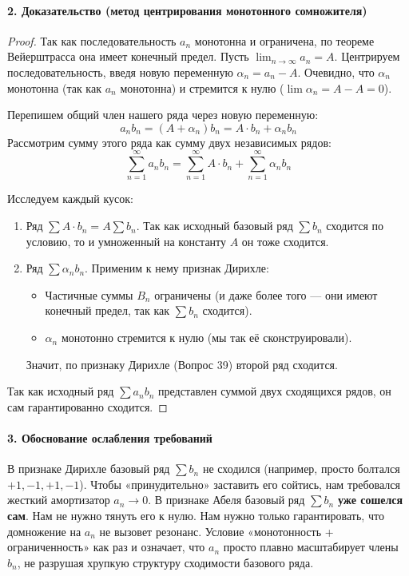 \paragraph{2. Доказательство (метод центрирования монотонного сомножителя)}
\begin{proof}
Так как последовательность $a_n$ монотонна и ограничена, по теореме Вейерштрасса она имеет конечный предел. Пусть $\lim_{n \to \infty} a_n = A$.
Центрируем последовательность, введя новую переменную $\alpha_n = a_n - A$. 
Очевидно, что $\alpha_n$ монотонна (так как $a_n$ монотонна) и стремится к нулю ($\lim \alpha_n = A - A = 0$).

Перепишем общий член нашего ряда через новую переменную:
$$ a_n b_n = (A + \alpha_n)b_n = A \cdot b_n + \alpha_n b_n $$
Рассмотрим сумму этого ряда как сумму двух независимых рядов:
$$ \sum_{n=1}^{\infty} a_n b_n = \sum_{n=1}^{\infty} A \cdot b_n + \sum_{n=1}^{\infty} \alpha_n b_n $$

Исследуем каждый кусок:
\begin{enumerate}
    \item Ряд $\sum A \cdot b_n = A \sum b_n$. Так как исходный базовый ряд $\sum b_n$ сходится по условию, то и умноженный на константу $A$ он тоже сходится.
    \item Ряд $\sum \alpha_n b_n$. Применим к нему признак Дирихле:
    \begin{itemize}
        \item Частичные суммы $B_n$ ограничены (и даже более того — они имеют конечный предел, так как $\sum b_n$ сходится).
        \item $\alpha_n$ монотонно стремится к нулю (мы так её сконструировали).
    \end{itemize}
    Значит, по признаку Дирихле (Вопрос 39) второй ряд сходится.
\end{enumerate}
Так как исходный ряд $\sum a_n b_n$ представлен суммой двух сходящихся рядов, он сам гарантированно сходится.
\end{proof}

\paragraph{3. Обоснование ослабления требований}
В признаке Дирихле базовый ряд $\sum b_n$ не сходился (например, просто болтался $+1, -1, +1, -1$). Чтобы «принудительно» заставить его сойтись, нам требовался жесткий амортизатор $a_n \to 0$.
В признаке Абеля базовый ряд $\sum b_n$ \textbf{уже сошелся сам}. Нам не нужно тянуть его к нулю. Нам нужно только гарантировать, что домножение на $a_n$ не вызовет резонанс. Условие «монотонность + ограниченность» как раз и означает, что $a_n$ просто плавно масштабирует члены $b_n$, не разрушая хрупкую структуру сходимости базового ряда.

